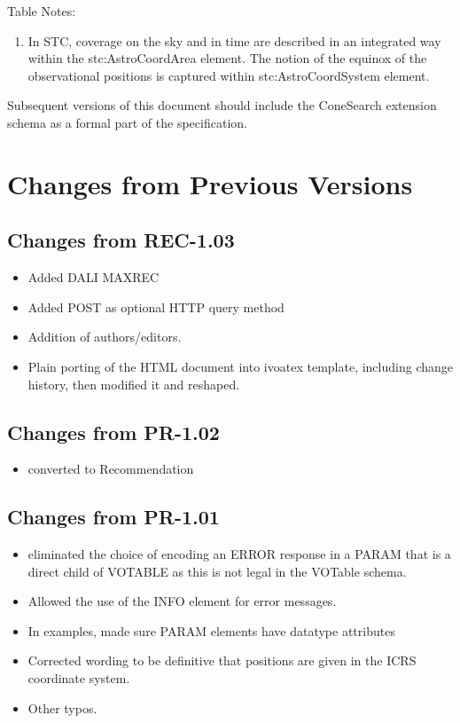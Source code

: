\documentclass[11pt,a4paper]{ivoa}
\begin{document}
Table Notes:
\begin{enumerate}
	\item In STC, coverage on the sky and in time are described in an integrated way within the stc:AstroCoordArea element. The notion of the equinox of the observational positions is captured within stc:AstroCoordSystem element.
\end{enumerate}
Subsequent versions of this document should include the ConeSearch extension schema as a formal part of the specification.

\section{Changes from Previous Versions}
\label{app:changes}

\subsection{Changes from REC-1.03}
\begin{itemize}
	\item Added DALI MAXREC
	\item Added POST as optional HTTP query method
	\item Addition of authors/editors.
	\item Plain porting of the HTML document into ivoatex template, including change history, then modified it and reshaped.
\end{itemize}

\subsection{Changes from PR-1.02}
\begin{itemize}
	\item converted to Recommendation
\end{itemize}

\subsection{Changes from PR-1.01}
\begin{itemize}
	\item eliminated the choice of encoding an ERROR response in a PARAM that is a direct child of VOTABLE as this is not legal in the VOTable schema.
	\item Allowed the use of the INFO element for error messages.
	\item In examples, made sure PARAM elements have datatype attributes
	\item Corrected wording to be definitive that positions are given in the ICRS coordinate system.
	\item Other typos.
\end{itemize}
\end{document}
